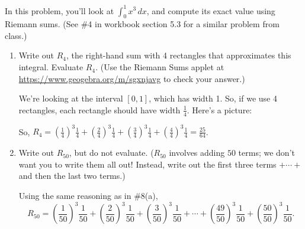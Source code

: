 \documentclass{article}
\begin{document}
\begin{enumerate}
  In this problem, you'll look at $\displaystyle \int_0^1 x^3\,dx$, and compute its exact value using Riemann sums. (See \#4 in workbook section 5.3 for a similar problem from class.)
  \begin{enumerate}
  \item
\begin{problem}[\vfill]
      Write out $R_4$, the right-hand sum with 4 rectangles that
      approximates this integral.  Evaluate $R_4$.  (Use the Riemann Sums
      applet at \url{https://www.geogebra.org/m/sgxnjavg} to check
      your answer.)
    \end{problem}

    \begin{solution}
      We're looking at the interval $[0, 1]$, which has width 1.  So, if
      we use 4 rectangles, each rectangle should have width
      $\frac{1}{4}$.  Here's a picture:
      \begin{center}
      \end{center}
      So, $\displaystyle R_4 = \left( \frac{1}{4} \right)^3 \frac{1}{4} +
      \left( \frac{2}{4} \right)^3 \frac{1}{4} + \left( \frac{3}{4}
      \right)^3 \frac{1}{4} + \left( \frac{4}{4} \right)^3 \frac{1}{4} =
      \boxed{\frac{25}{64}}$.
    \end{solution}

  \item
\begin{problem}[\vfill]
      Write out $R_{50}$, but do not evaluate.  ($R_{50}$ involves adding
      $50$ terms; we don't want you to write them all out!  Instead, write
      out the first three terms $+ \cdots + $ and then the last two
      terms.)
    \end{problem}

    \begin{solution}
      Using the same reasoning as in
      {{{{\#8}}(a)}}, \[R_{50} =
      \boxed{\left( \frac{1}{50} \right)^3 \frac{1}{50} + \left(
          \frac{2}{50} \right)^3 \frac{1}{50} + \left( \frac{3}{50}
        \right)^3 \frac{1}{50} + \cdots + \left( \frac{49}{50} \right)^3
        \frac{1}{50} + \left( \frac{50}{50} \right)^3 \frac{1}{50}}.\]
    \end{solution}


\end{enumerate}
\end{enumerate}
\end{document}
